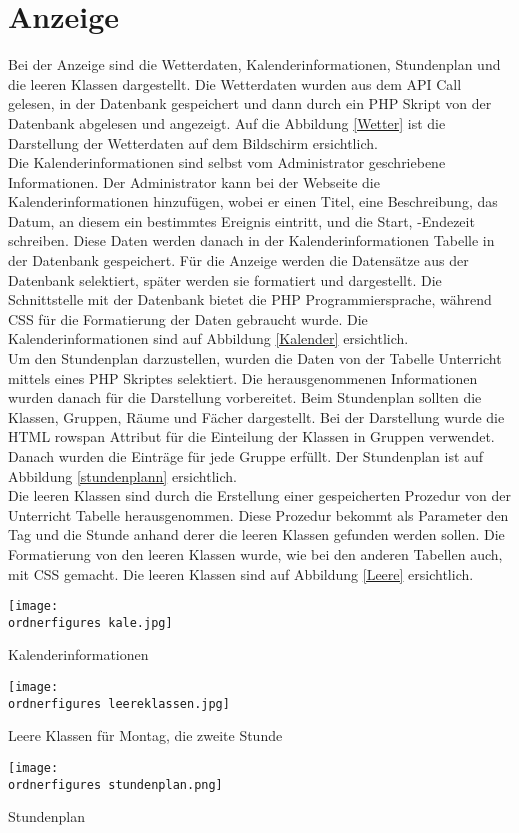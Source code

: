\section{Anzeige}
Bei der Anzeige sind die Wetterdaten, Kalenderinformationen, Stundenplan und die leeren Klassen dargestellt. Die Wetterdaten wurden aus dem API Call gelesen, in der Datenbank gespeichert und dann durch ein PHP Skript von der Datenbank abgelesen und angezeigt. Auf die Abbildung \ref{Wetter} ist die Darstellung der Wetterdaten auf dem Bildschirm ersichtlich. \\
Die Kalenderinformationen sind selbst vom Administrator geschriebene Informationen. Der Administrator kann bei der Webseite die Kalenderinformationen hinzuf\"ugen, wobei er einen Titel, eine Beschreibung, das Datum, an diesem ein bestimmtes Ereignis eintritt, und die Start, -Endezeit schreiben. Diese Daten werden danach in der Kalenderinformationen Tabelle in der Datenbank gespeichert. F\"ur die Anzeige werden die Datens\"atze aus der Datenbank selektiert, sp\"ater werden sie formatiert und dargestellt. Die Schnittstelle mit der Datenbank bietet die PHP Programmiersprache, w\"ahrend CSS f\"ur die Formatierung der Daten gebraucht wurde. Die Kalenderinformationen sind auf Abbildung \ref{Kalender} ersichtlich. \\
Um den Stundenplan darzustellen, wurden die Daten von der Tabelle Unterricht mittels eines PHP Skriptes selektiert. Die herausgenommenen Informationen wurden danach f\"ur die Darstellung vorbereitet.  Beim Stundenplan sollten die Klassen, Gruppen, R\"aume und F\"acher dargestellt. Bei der Darstellung wurde die HTML rowspan Attribut f\"ur die Einteilung der Klassen in Gruppen verwendet. Danach wurden die Eintr\"age f\"ur jede Gruppe erf\"ullt. Der Stundenplan ist auf Abbildung \ref{stundenplann} ersichtlich. \\
Die leeren Klassen sind durch die Erstellung einer gespeicherten Prozedur von der Unterricht Tabelle herausgenommen. Diese Prozedur bekommt als Parameter den Tag und die Stunde anhand derer die leeren Klassen gefunden werden sollen. Die Formatierung von den leeren Klassen wurde, wie bei den anderen Tabellen auch, mit CSS gemacht. Die leeren Klassen sind auf Abbildung \ref{Leere} ersichtlich. \\
\begin{center}
	\captionsetup{type=figure}
	\texttt{[image: \\ordnerfigures kale.jpg]}
	\caption{Kalenderinformationen}
	\label{Kalender}
\end{center}
\begin{center}
	\captionsetup{type=figure}
	\texttt{[image: \\ordnerfigures leereklassen.jpg]}
	\caption{Leere Klassen f\"ur Montag, die zweite Stunde}
	\label{Leere} 
\end{center}
\begin{center}
	\captionsetup{type=figure}
	\texttt{[image: \\ordnerfigures stundenplan.png]}
	\caption{Stundenplan}
	\label{stundenplann} 
\end{center}

